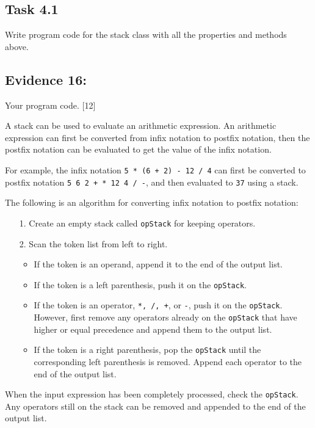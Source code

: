 \subsection*{Task 4.1 }

Write program code for the stack class with all the properties and
methods above.

\subsection*{Evidence 16:}

Your program code. \hfill{}{[}12{]}

A stack can be used to evaluate an arithmetic expression. An arithmetic
expression can first be converted from infix notation to postfix notation,
then the postfix notation can be evaluated to get the value of the
infix notation. 

For example, the infix notation \texttt{5 {*} (6 + 2) - 12 / 4} can
first be converted to postfix notation \texttt{5 6 2 + {*} 12 4 /
-}, and then evaluated to \texttt{37} using a stack. 

The following is an algorithm for converting infix notation to postfix
notation:
\begin{enumerate}
\item[1.]  Create an empty stack called \texttt{opStack} for keeping operators. 
\item[2.]  Scan the token list from left to right. 
\begin{itemize}
\item If the token is an operand, append it to the end of the output list. 
\item If the token is a left parenthesis, push it on the \texttt{opStack}. 
\item If the token is an operator, \texttt{{*}, /, +}, or \texttt{-}, push
it on the \texttt{opStack}. However, first remove any operators already
on the \texttt{opStack} that have higher or equal precedence and append
them to the output list. 
\item If the token is a right parenthesis, pop the \texttt{opStack} until
the corresponding left parenthesis is removed. Append each operator
to the end of the output list. 
\end{itemize}
\end{enumerate}
When the input expression has been completely processed, check the
\texttt{opStack}. Any operators still on the stack can be removed
and appended to the end of the output list. 

